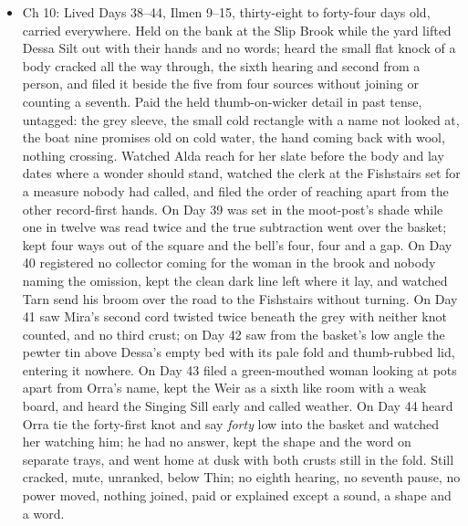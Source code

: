 \documentclass{design/chronicle}
\begin{document}
{\begin{itemize}[leftmargin=1.4em,itemsep=1pt,topsep=3pt,parsep=0pt]
\end{itemize}

\begin{itemize}[leftmargin=1.4em,itemsep=1pt,topsep=3pt,parsep=0pt]

\item Ch 10: Lived Days 38–44, Ilmen 9–15, thirty-eight to forty-four days old, carried everywhere. Held on the bank at the Slip Brook while the yard lifted Dessa Silt out with their hands and no words; heard the small flat knock of a body cracked all the way through, the sixth hearing and second from a person, and filed it beside the five from four sources without joining or counting a seventh. Paid the held thumb-on-wicker detail in past tense, untagged: the grey sleeve, the small cold rectangle with a name not looked at, the boat nine promises old on cold water, the hand coming back with wool, nothing crossing. Watched Alda reach for her slate before the body and lay dates where a wonder should stand, watched the clerk at the Fishstairs set for a measure nobody had called, and filed the order of reaching apart from the other record-first hands. On Day 39 was set in the moot-post’s shade while one in twelve was read twice and the true subtraction went over the basket; kept four ways out of the square and the bell’s four, four and a gap. On Day 40 registered no collector coming for the woman in the brook and nobody naming the omission, kept the clean dark line left where it lay, and watched Tarn send his broom over the road to the Fishstairs without turning. On Day 41 saw Mira’s second cord twisted twice beneath the grey with neither knot counted, and no third crust; on Day 42 saw from the basket’s low angle the pewter tin above Dessa’s empty bed with its pale fold and thumb-rubbed lid, entering it nowhere. On Day 43 filed a green-mouthed woman looking at pots apart from Orra’s name, kept the Weir as a sixth like room with a weak board, and heard the Singing Sill early and called weather. On Day 44 heard Orra tie the forty-first knot and say \emph{forty} low into the basket and watched her watching him; he had no answer, kept the shape and the word on separate trays, and went home at dusk with both crusts still in the fold. Still cracked, mute, unranked, below Thin; no eighth hearing, no seventh pause, no power moved, nothing joined, paid or explained except a sound, a shape and a word.

\end{itemize}

\begin{itemize}[leftmargin=1.4em,itemsep=1pt,topsep=3pt,parsep=0pt]


\end{itemize}}
\end{document}
